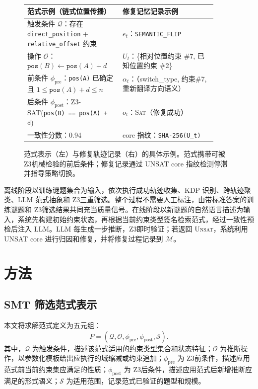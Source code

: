\documentclass[UTF8,a4paper,12pt]{ctexart}
\newcommand{\sat}{\textsc{Sat}}
\newcommand{\unsat}{\textsc{Unsat}}
\newcommand{\zthree}{Z3}
\begin{document}
\begin{figure}[t]
  \centering
  \small
  \begin{tabular}{|p{0.45\linewidth}|p{0.45\linewidth}|}
  \hline
  \textbf{范式示例（链式位置传播）} & \textbf{修复记忆记录示例} \\
  \hline
  触发条件 \(\mathcal{Q}\)：存在 \texttt{direct\_position} + \texttt{relative\_offset} 约束 & \(e_t\)：\texttt{SEMANTIC\_FLIP} \\
  操作 \(\mathcal{O}\)：\(\texttt{pos}(B) \leftarrow \texttt{pos}(A) + d\) & \(U_t\)：\{相对位置约束 \#7, 已知位置约束 \#2\} \\
  前条件 \(\phi_\text{pre}\)：\texttt{pos(A)} 已确定且 \(1\leq \texttt{pos}(A)+d\leq n\) & \(\alpha_t\)：（switch\_type, 约束\#7, 重新翻译方向语义） \\
  后条件 \(\phi_\text{post}\)：\zthree-SAT(\texttt{pos(B) == pos(A) + d}) & \(o_t\)：\sat（修复成功） \\
  一致性分数：0.94 & core 指纹：\texttt{SHA-256(U\_t)} \\
  \hline
  \end{tabular}
  \caption{范式表示（左）与修复轨迹记录（右）的具体示例。范式携带可被 \zthree 机械检验的前后条件；修复记录通过 UNSAT core 指纹检测停滞并指导策略切换。}
  \label{fig:example}
\end{figure}

离线阶段以训练谜题集合为输入，依次执行成功轨迹收集、KDP 识别、跨轨迹聚类、LLM 范式抽象和 \zthree 三重筛选。整个过程不需要人工标注，由带标准答案的训练谜题和 \zthree 筛选结果共同充当质量信号。在线阶段以新谜题的自然语言描述为输入，系统先构建初始约束状态，再根据当前约束类型签名检索范式，经过一致性预检后注入 LLM。LLM 每生成一步推断，\zthree 即时验证；若返回 \unsat，系统利用 UNSAT core 进行归因和修复，并将修复过程记录到 \(\mathcal{M}\)。

\section{方法}

\subsection{SMT 筛选范式表示}

本文将求解范式定义为五元组：
\begin{equation}
  P=(\mathcal{Q},\mathcal{O},\phi_{\text{pre}},\phi_{\text{post}},\mathcal{S}).
\end{equation}
其中，\(\mathcal{Q}\) 为触发条件，描述该范式适用的约束类型集合和状态特征；\(\mathcal{O}\) 为推断操作，以参数化模板给出应执行的域缩减或约束追加；\(\phi_{\text{pre}}\) 为 \zthree 前条件，描述应用范式前当前约束集应满足的性质；\(\phi_{\text{post}}\) 为 \zthree 后条件，描述应用范式后新增推断应满足的形式语义；\(\mathcal{S}\) 为适用范围，记录范式已验证的题型和规模。
\end{document}
